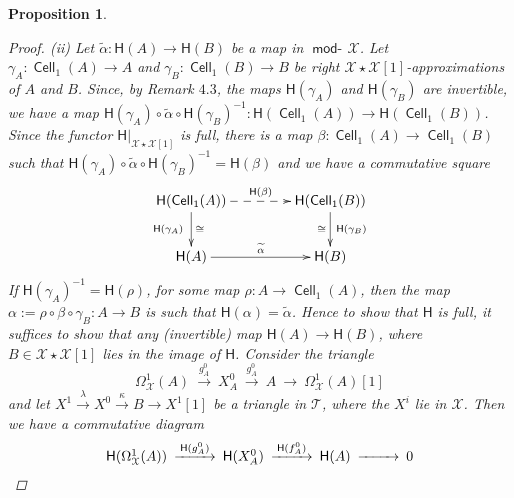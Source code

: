 \documentclass[oneside, a4paper,reqno]{amsart}
\numberwithin{equation}{section}
\newtheorem{prop}[thm]{Proposition}
\theoremstyle{definition}
\begin{document}
\begin{prop}
\begin{proof}
(ii)  Let $\widetilde{\alpha} \colon \mathsf{H}(A) {\longrightarrow} \mathsf{H}(B)$ be a map in $\operatorname*{\mathsf{mod}-\!}{\mathcal X}$. Let $\gamma_{A} \colon \operatorname*{{\mathsf{Cell}}}_{1}(A) {\longrightarrow} A$ and $\gamma_{B} \colon \operatorname*{{\mathsf{Cell}}}_{1}(B) {\longrightarrow} B$ be right ${\mathcal X}\star {\mathcal X}[1]$-approximations of $A$ and $B$. Since, by Remark $4.3$, the maps $\mathsf{H}(\gamma_{A})$ and $\mathsf{H}(\gamma_{B})$ are invertible, we have a map $\mathsf{H}(\gamma_{A}) \circ \widetilde{\alpha} \circ \mathsf{H}(\gamma_{B})^{-1} \colon \mathsf{H}(\operatorname*{{\mathsf{Cell}}}_{1}(A)) {\longrightarrow} \mathsf{H}(\operatorname*{{\mathsf{Cell}}}_{1}(B))$. Since the functor $\mathsf{H}|_{{\mathcal X}\star{\mathcal X}[1]}$ is full, there is a map $\beta \colon \operatorname*{{\mathsf{Cell}}}_{1}(A) {\longrightarrow} \operatorname*{{\mathsf{Cell}}}_{1}(B)$ such that $\mathsf{H}(\gamma_{A}) \circ \widetilde{\alpha} \circ \mathsf{H}(\gamma_{B})^{-1} = \mathsf{H}(\beta)$ and we have a commutative square 
\[
\xymatrix@C=1.5cm{
  \mathsf{H}(\operatorname*{{\mathsf{Cell}}}_{1}(A)) \ar[d]_{\mathsf{H}(\gamma_{A}) \,\, }^{\cong} \ar@{-->}[r]^{\mathsf{H}(\beta)}  & \mathsf{H}(\operatorname*{{\mathsf{Cell}}}_{1}(B)) \ar[d]^{\, \mathsf{H}(\gamma_{B})}_{\cong}  \\
  \mathsf{H}(A) \ar[r]^{\widetilde{\alpha}} &  \mathsf{H}(B)  }   
\]
  If $\mathsf{H}(\gamma_{A})^{-1} = \mathsf{H}(\rho)$, for some map $\rho \colon A {\longrightarrow} \operatorname*{{\mathsf{Cell}}}_{1}(A)$, then the map $\alpha := \rho \circ  \beta \circ \gamma_{B} \colon A {\longrightarrow} B$ is such that $\mathsf{H}(\alpha) = \widetilde{\alpha}$. Hence to show that $\mathsf{H}$ is full, it suffices to show that any (invertible) map $\mathsf{H}(A) {\longrightarrow} \mathsf{H}(B)$, where $B \in {\mathcal X}\star{\mathcal X}[1]$ lies in the image of $\mathsf{H}$. Consider the triangle 
\[
\Omega^{1}_{\mathcal X}(A) \ \stackrel{g^{0}_{A}}{\longrightarrow} \ X^{0}_{A} \ \stackrel{g^{0}_{A}}{\longrightarrow} \ A \ {\longrightarrow} \ \Omega^{1}_{\mathcal X}(A)[1]
\]
 and let $X^{1} \stackrel{\lambda}{\longrightarrow} X^{0} \stackrel{\kappa}{\longrightarrow} B {\longrightarrow} X^{1}[1]$ be a triangle in ${\mathcal T}$, where the $X^{i}$ lie in ${\mathcal X}$. Then we have a commutative diagram
  \begin{equation}
\begin{CD}
\mathsf{H}(\Omega^{1}_{\mathcal X}(A)) @> \mathsf{H}(g^{0}_{A}) >> \mathsf{H}(X^{0}_{A}) @> \mathsf{H}(f^{0}_{A}) >> \mathsf{H}(A) @>  >> 0 \\

\end{CD}
\end{equation}
\end{proof}
\end{prop}
\end{document}
